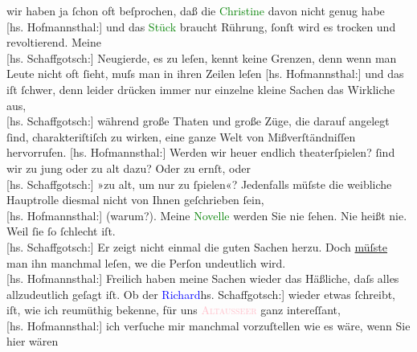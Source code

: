                     wir haben ja ſchon oft beſprochen, daß die \textcolor{green}{Christine}{} davon nicht genug habe {\\}{[}hs. Hofmannsthal:{]} und das \textcolor{green}{Stück}{} braucht Rührung, ſonſt wird es trocken und revoltierend. Meine
                        {\\}{[}hs. Schaffgotsch:{]} Neugierde, es zu leſen, kennt keine Grenzen,
                    denn wenn man Leute nicht oft ſieht, muſs man in ihren Zeilen leſen \pend
           \pstart
           {\pb}{[}hs. Hofmannsthal:{]} und das iſt ſchwer, denn leider drücken immer nur
                    einzelne kleine Sachen das Wirkliche aus, {\\}{[}hs. Schaffgotsch:{]} während
                    große Thaten und große Züge, die darauf angelegt ſind, charakteriſtiſch zu
                    wirken, eine ganze Welt von Mißverſtändniſſen hervorrufen.\pend
           \pstart
           {[}hs. Hofmannsthal:{]} Werden wir heuer endlich theaterſpielen? { }ſind wir zu jung oder zu alt dazu? Oder zu ernſt,
                    oder {\\}{[}hs. Schaffgotsch:{]} »zu alt, um nur zu ſpielen«? Jedenfalls müſste
                    die weibliche Hauptrolle diesmal nicht von Ihnen geſchrieben ſein, {\\}{[}hs. Hofmannsthal:{]} (warum?). Meine \textcolor{green}{Novelle}{}\ledrightnote{\textcolor{green}{Geschichte der beiden Liebespaare}}
                    werden Sie nie ſehen. Nie heißt nie. Weil ſie ſo ſchlecht iſt. {\\}{[}hs. Schaffgotsch:{]} Er zeigt nicht einmal die guten Sachen herzu. Doch \uline{müſste} man ihn manchmal leſen, we{\geminationn} die Perſon undeutlich wird. {\\}{[}hs. Hofmannsthal:{]} Freilich haben meine Sachen wieder das Häßliche, daſs alles
                    allzudeutlich geſagt iſt. Ob der \textcolor{blue}{Richard}{}\ledrightnote{\textcolor{blue}{Richard Beer-Hofmann}}{\\}{[}hs. Schaffgotsch:{]} wieder etwas ſchreibt, iſt, wie ich reumüthig
                    bekenne, für uns \textcolor{pink}{\textsc{Altausseer}}{}\ledrightnote{\textcolor{pink}{Altaussee}} ganz intereſſant, {\\}{[}hs. Hofmannsthal:{]} ich verſuche mir manchmal
                        vor\introOben{}zu\introOben{}ſtellen wie es wäre, wenn Sie hier wären

